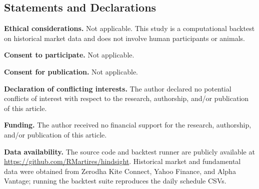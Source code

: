 \documentclass{article}
\begin{document}
\subsection*{Statements and Declarations}

\textbf{Ethical considerations.} Not applicable. This study is a computational backtest on historical market data and does not involve human participants or animals.

\textbf{Consent to participate.} Not applicable.

\textbf{Consent for publication.} Not applicable.

\textbf{Declaration of conflicting interests.} The author declared no potential conflicts of interest with respect to the research, authorship, and/or publication of this article.

\textbf{Funding.} The author received no financial support for the research, authorship, and/or publication of this article.

\textbf{Data availability.} The source code and backtest runner are publicly available at \url{https://github.com/RMartires/hindsight}. Historical market and fundamental data were obtained from Zerodha Kite Connect, Yahoo Finance, and Alpha Vantage; running the backtest suite reproduces the daily schedule CSVs.
\end{document}
